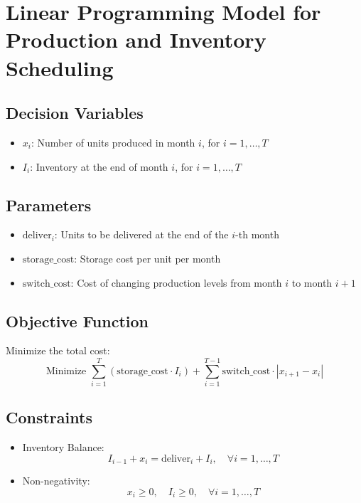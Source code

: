 \documentclass{article}
\begin{document}
\section*{Linear Programming Model for Production and Inventory Scheduling}

\subsection*{Decision Variables}
\begin{itemize}
    \item $x_i$: Number of units produced in month $i$, for $i = 1, \ldots, T$
    \item $I_i$: Inventory at the end of month $i$, for $i = 1, \ldots, T$
\end{itemize}

\subsection*{Parameters}
\begin{itemize}
    \item $\text{deliver}_i$: Units to be delivered at the end of the $i$-th month
    \item $\text{storage\_cost}$: Storage cost per unit per month
    \item $\text{switch\_cost}$: Cost of changing production levels from month $i$ to month $i+1$
\end{itemize}

\subsection*{Objective Function}
Minimize the total cost:
\[
\text{Minimize } \sum_{i=1}^{T} (\text{storage\_cost} \cdot I_i) + \sum_{i=1}^{T-1} \text{switch\_cost} \cdot |x_{i+1} - x_i|
\]

\subsection*{Constraints}
\begin{itemize}
    \item Inventory Balance:
    \[
    I_{i-1} + x_i = \text{deliver}_i + I_i, \quad \forall i = 1, \ldots, T
    \]
    \item Non-negativity:
    \[
    x_i \geq 0, \quad I_i \geq 0, \quad \forall i = 1, \ldots, T
    \]
\end{itemize}
\end{document}
